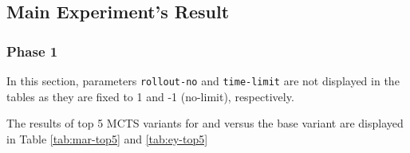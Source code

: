 



\subsection{Main Experiment's Result}

\subsubsection{Phase 1}


In this section, parameters \texttt{rollout-no} and \texttt{time-limit} are not displayed in the tables as they are fixed to 1 and -1 (no-limit), respectively.

The results of top 5 MCTS variants for \Marquise{} and \Eyrie{} versus the base variant are displayed in Table \ref{tab:mar-top5} and \ref{tab:ey-top5}

